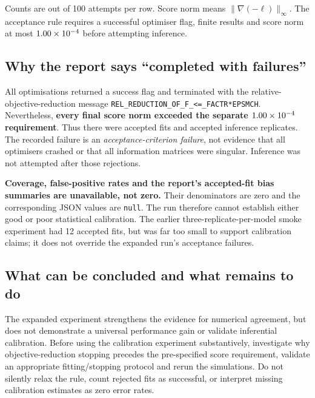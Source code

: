 \documentclass[11pt,a4paper]{article}
\begin{document}
\begin{center}\small
\ExpandedCalibrationTable
\end{center}
\noindent Counts are out of 100 attempts per row. Score norm means
$\|\nabla(-\ell)\|_\infty$. The acceptance rule requires a successful optimiser
flag, finite results and score norm at most $1.00\times 10^{-4}$ before
attempting inference.

\subsection{Why the report says ``completed with failures''}
All \ExpandedAttempts{} optimisations returned a success flag and terminated
with the relative-objective-reduction message
\texttt{REL\_REDUCTION\_OF\_F\_<=\_FACTR*EPSMCH}.
Nevertheless, \textbf{every final score norm exceeded the separate
$1.00\times 10^{-4}$ requirement}. Thus there were
\ExpandedAcceptedFits{} accepted fits and \ExpandedAcceptedInferences{}
accepted inference replicates.
The recorded failure is an \emph{acceptance-criterion failure}, not evidence
that all optimisers crashed or that all information matrices were singular.
Inference was not attempted after those rejections.

\textbf{Coverage, false-positive rates and the report's accepted-fit bias
summaries are unavailable, not zero.}
Their denominators are zero and the corresponding JSON values are
\texttt{null}. The run therefore cannot establish either good or poor
statistical calibration.
The earlier three-replicate-per-model smoke experiment had 12 accepted fits,
but was far too small to support calibration claims; it does not override
the expanded run's acceptance failures.

\subsection{What can be concluded and what remains to do}
The expanded experiment strengthens the evidence for numerical agreement,
but does not demonstrate a universal performance gain or validate inferential
calibration. Before using the calibration experiment substantively, investigate
why objective-reduction stopping precedes the pre-specified score requirement,
validate an appropriate fitting/stopping protocol and rerun the simulations.
Do not silently relax the rule, count rejected fits as successful, or
interpret missing calibration estimates as zero error rates.
\end{document}
